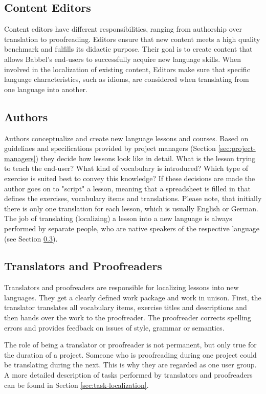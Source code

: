 \subsection{Content Editors}
Content editors have different responsibilities, ranging from authorship over translation to proofreading. Editors ensure that new content meets a high quality benchmark and fulfills its didactic purpose. Their goal is to create content that allows Babbel's end-users to successfully acquire new language skills. When involved in the localization of existing content, Editors make sure that specific language characteristics, such as idioms, are considered when translating from one language into another.

\subsection{Authors}
Authors conceptualize and create new language lessons and courses. Based on guidelines and specifications provided by project managers (Section \ref{sec:project-managers}) they decide how lessons look like in detail. What is the lesson trying to teach the end-user? What kind of vocabulary is introduced? Which type of exercise is suited best to convey this knowledge? If these decisions are made the author goes on to "script" a lesson, meaning that a spreadsheet is filled in that defines the exercises, vocabulary items and translations. Please note, that initially there is only one translation for each lesson, which is usually English or German. The job of translating (localizing) a lesson into a new language is always performed by separate people, who are native speakers of the respective language (see Section \ref{sec:translators-proofreaders}).

\subsection{Translators and Proofreaders} \label{sec:translators-proofreaders}
Translators and proofreaders are responsible for localizing lessons into new languages. They get a clearly defined work package and work in unison. First, the translator translates all vocabulary items, exercise titles and descriptions and then hands over the work to the proofreader. The proofreader corrects spelling errors and provides feedback on issues of style, grammar or semantics.

The role of being a translator or proofreader is not permanent, but only true for the duration of a project. Someone who is proofreading during one project could be translating during the next. This is why they are regarded as one user group. A more detailed description of tasks performed by translators and proofreaders can be found in Section \ref{sec:task-localization}.


